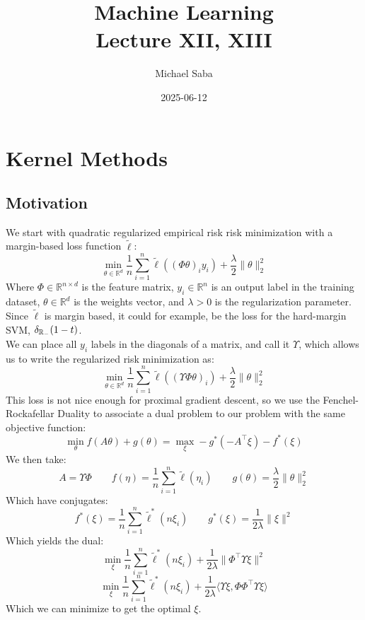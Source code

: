 \documentclass[12pt]{article}
\title{%
    \Huge Machine Learning \\
    \Large Lecture XII, XIII
}
\date{2025-06-12}
\author{Michael Saba}
\begin{document}
\maketitle
\newpage
\setlength{\parindent}{0pt}

\section*{Kernel Methods}
\subsection*{Motivation}


We start with quadratic regularized empirical risk
risk minimization with a margin-based loss 
function $\tilde{\ell}$:
\[ \min_{\theta \in \mathbb{R}^d} \frac{1}{n} 
\sum_{i=1}^n \tilde{\ell}((\Phi \theta)_i y_i) + 
\frac{\lambda}{2} \|\theta\|_2^2 \] 
Where $\Phi \in 
\mathbb{R}^{n \times d}$ is the feature matrix,
$y_i \in \mathbb{R}^n$ is an output label in the
training dataset, $\theta \in \mathbb{R}^d$
is the weights vector, and  $\lambda > 0$
is the regularization parameter. \\
Since $\tilde{\ell}$ is margin based, it could for 
example, be the loss for the hard-margin SVM,
$\delta_{\mathbb{R}_-}(1-t)$. \\

We can place all $y_i$ labels in the diagonals of
a matrix, and call it $\Upsilon$,
which allows us to write the regularized risk
minimization as:
\[ \min_{\theta \in \mathbb{R}^d} \frac{1}{n} 
\sum_{i=1}^n \tilde{\ell}((\Upsilon \Phi \theta)_i) + 
\frac{\lambda}{2} \|\theta\|_2^2\]
This loss is not nice enough for proximal gradient
descent, so we use the Fenchel-Rockafellar Duality
to associate a dual problem to our problem with the
same objective function:
\[ \min_{\theta} f(A\theta) + g(\theta) = 
\max_{\xi} -g^*(-A^\top \xi) - f^*(\xi) \]
We then take:
\[ A = \Upsilon \Phi \qquad 
f(\eta) = \frac{1}{n} \sum_{i=1}^n \tilde{\ell}(\eta_i) 
\qquad g(\theta) = \frac{\lambda}{2} \|\theta\|^2_2\]
Which have conjugates:
\[ f^*(\xi) = \frac{1}{n} \sum_{i=1}^n 
\tilde{\ell}^*(n\xi_i) \qquad 
g^*(\xi) = \frac{1}{2\lambda} \|\xi\|^2\]
Which yields the dual:
\[ \min_{\xi} \frac{1}{n} \sum_{i=1}^n 
\tilde{\ell}^*(n\xi_i) + \frac{1}{2\lambda} 
\|\Phi^\top \Upsilon \xi\|^2\] 
\[ \min_{\xi} \frac{1}{n} \sum_{i=1}^n 
\tilde{\ell}^*(n\xi_i) + \frac{1}{2\lambda} \langle 
\Upsilon \xi, \Phi \Phi^\top \Upsilon \xi \rangle \]
Which we can minimize to get the optimal $\xi$. \\
\end{document}
